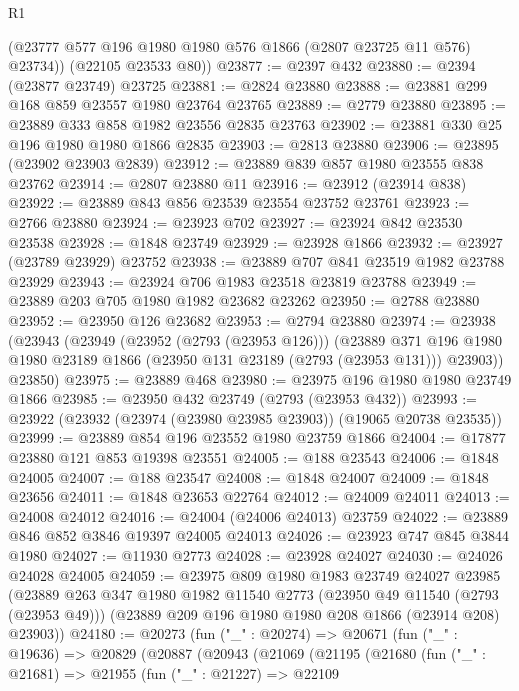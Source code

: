 \begin{lexlean}{R1}
\begin{coremodule}
        (@23777 @577 @196 @1980 @1980 @576 @1866 (@2807 @23725 @11 @576) @23734))
      (@22105 @23533 @80))
@23877 := @2397 @432
@23880 := @2394 (@23877 @23749) @23725
@23881 := @2824 @23880
@23888 := @23881 @299 @168 @859 @23557 @1980 @23764 @23765
@23889 := @2779 @23880
@23895 := @23889 @333 @858 @1982 @23556 @2835 @23763
@23902 := @23881 @330 @25 @196 @1980 @1980 @1866 @2835
@23903 := @2813 @23880
@23906 := @23895 (@23902 @23903 @2839)
@23912 := @23889 @839 @857 @1980 @23555 @838 @23762
@23914 := @2807 @23880 @11
@23916 := @23912 (@23914 @838)
@23922 := @23889 @843 @856 @23539 @23554 @23752 @23761
@23923 := @2766 @23880
@23924 := @23923 @702
@23927 := @23924 @842 @23530 @23538
@23928 := @1848 @23749
@23929 := @23928 @1866
@23932 := @23927 (@23789 @23929) @23752
@23938 := @23889 @707 @841 @23519 @1982 @23788 @23929
@23943 := @23924 @706 @1983 @23518 @23819 @23788
@23949 := @23889 @203 @705 @1980 @1982 @23682 @23262
@23950 := @2788 @23880
@23952 := @23950 @126 @23682
@23953 := @2794 @23880
@23974 := @23938
    (@23943
      (@23949
        (@23952 (@2793 (@23953 @126)))
        (@23889
          @371
          @196
          @1980
          @1980
          @23189
          @1866
          (@23950 @131 @23189 (@2793 (@23953 @131)))
          @23903))
      @23850)
@23975 := @23889 @468
@23980 := @23975 @196 @1980 @1980 @23749 @1866
@23985 := @23950 @432 @23749 (@2793 (@23953 @432))
@23993 := @23922 (@23932 (@23974 (@23980 @23985 @23903)) (@19065 @20738 @23535))
@23999 := @23889 @854 @196 @23552 @1980 @23759 @1866
@24004 := @17877 @23880 @121 @853 @19398 @23551
@24005 := @188 @23543
@24006 := @1848 @24005
@24007 := @188 @23547
@24008 := @1848 @24007
@24009 := @1848 @23656
@24011 := @1848 @23653 @22764
@24012 := @24009 @24011
@24013 := @24008 @24012
@24016 := @24004 (@24006 @24013) @23759
@24022 := @23889 @846 @852 @3846 @19397 @24005 @24013
@24026 := @23923 @747 @845 @3844 @1980
@24027 := @11930 @2773
@24028 := @23928 @24027
@24030 := @24026 @24028 @24005
@24059 := @23975
    @809
    @1980
    @1983
    @23749
    @24027
    @23985
    (@23889
      @263
      @347
      @1980
      @1982
      @11540
      @2773
      (@23950 @49 @11540 (@2793 (@23953 @49)))
      (@23889 @209 @196 @1980 @1980 @208 @1866 (@23914 @208) @23903))
@24180 := @20273
    (fun ("_" : @20274) =>
    @20671
      (fun ("_" : @19636) =>
      @20829
        (@20887
          (@20943
            (@21069
              (@21195
                (@21680
                  (fun ("_" : @21681) =>
                  @21955
                    (fun ("_" : @21227) =>
                    @22109

\end{coremodule}
\end{lexlean}
